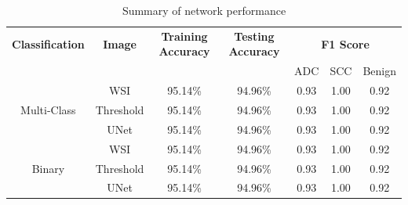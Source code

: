 \documentclass[conference]{IEEEtran}
\begin{document}
\begin{table} 
\begin{center}
\begin{tabular}[scale=2.0]{ |c|c|c|c|c|c|c| }
  \hline
  \textbf{Classification}&\textbf{Image}&\textbf{Training Accuracy}&\textbf{Testing Accuracy}&\multicolumn{3}{c|}{\textbf{F1 Score}}\\\cline{5-7}
  &&&&ADC&SCC&Benign\\
  \hline
  
  \multirow{3}{*}{Multi-Class}&WSI&95.14\%&94.96\%&0.93&1.00&0.92\\\cline{2-7}
  &Threshold&95.14\%&94.96\%&0.93&1.00&0.92\\\cline{2-7}
  &UNet&95.14\%&94.96\%&0.93&1.00&0.92\\
  \hline
  
  \multirow{3}{*}{Binary}&WSI&95.14\%&94.96\%&0.93&1.00&0.92\\\cline{2-7}
  &Threshold&95.14\%&94.96\%&0.93&1.00&0.92\\\cline{2-7}
  &UNet&95.14\%&94.96\%&0.93&1.00&0.92\\
  \hline
  
\end{tabular}
\caption{Summary of network performance}
\label{metrics_summary}
\end{center}
\end{table}




   
   
\end{document}
